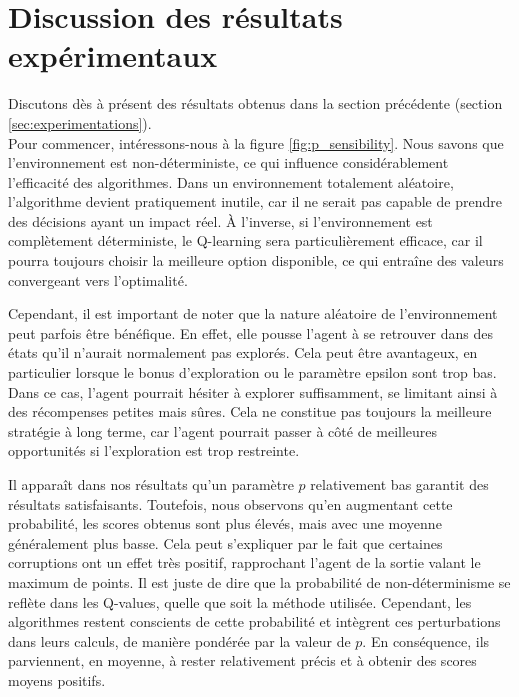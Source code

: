 \documentclass{article}
\begin{document}
\section{Discussion des résultats expérimentaux}
\label{sec:discussion}

\noindent Discutons dès à présent des résultats obtenus dans la section précédente (section \ref{sec:experimentations}). \\

\noindent Pour commencer, intéressons-nous à la figure \ref{fig:p_sensibility}. Nous savons que l'environnement est non-déterministe, ce qui influence considérablement l'efficacité des algorithmes. Dans un environnement totalement aléatoire, l'algorithme devient pratiquement inutile, car il ne serait pas capable de prendre des décisions ayant un impact réel. À l'inverse, si l'environnement est complètement déterministe, le Q-learning sera particulièrement efficace, car il pourra toujours choisir la meilleure option disponible, ce qui entraîne des valeurs convergeant vers l'optimalité.

\noindent Cependant, il est important de noter que la nature aléatoire de l'environnement peut parfois être bénéfique. En effet, elle pousse l'agent à se retrouver dans des états qu'il n'aurait normalement pas explorés. Cela peut être avantageux, en particulier lorsque le bonus d'exploration ou le paramètre epsilon sont trop bas. Dans ce cas, l'agent pourrait hésiter à explorer suffisamment, se limitant ainsi à des récompenses petites mais sûres. Cela ne constitue pas toujours la meilleure stratégie à long terme, car l'agent pourrait passer à côté de meilleures opportunités si l'exploration est trop restreinte.

\noindent Il apparaît dans nos résultats qu'un paramètre $p$ relativement bas garantit des résultats satisfaisants. Toutefois, nous observons qu'en augmentant cette probabilité, les scores obtenus sont plus élevés, mais avec une moyenne généralement plus basse. Cela peut s'expliquer par le fait que certaines corruptions ont un effet très positif, rapprochant l'agent de la sortie valant le maximum de points. Il est juste de dire que la probabilité de non-déterminisme se reflète dans les Q-values, quelle que soit la méthode utilisée. Cependant, les algorithmes restent conscients de cette probabilité et intègrent ces perturbations dans leurs calculs, de manière pondérée par la valeur de $p$. En conséquence, ils parviennent, en moyenne, à rester relativement précis et à obtenir des scores moyens positifs. \\
\end{document}
